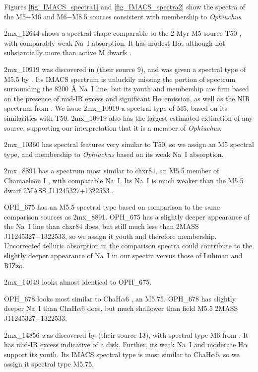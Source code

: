 Figures \ref{fig_IMACS_spectra1} and \ref{fig_IMACS_spectra2} show the spectra of the M5$-$M6 and M6$-$M8.5 sources consistent with membership to \emph{Ophiuchus}.

2mx\_12644 shows a spectral shape comparable to the 2 Myr M5 source T50 \citep{2004ApJ...602..816L}, with comparably weak Na~I absorption.  It has modest H$\alpha$, although not substantially more than active M dwarfs \citep{2011AJ....141...97W}.  

2mx\_10919 was discovered in \citet{allers06} (their source 9), and was given a spectral type of M5.5 by \citet{2011ASPC..448..633G}.  Its IMACS spectrum is unluckily missing the portion of spectrum surrounding the 8200 $\mbox{\normalfont\AA}$ Na~I line, but its youth and membership are firm based on the presence of mid-IR excess and significant H$\alpha$ emission, as well as the NIR spectrum from \citet{2011ASPC..448..633G}.  We issue 2mx\_10919 a spectral type of M5, based on its similarities with T50.  2mx\_10919 also has the largest estimated extinction of any source, supporting our interpretation that it is a member of \emph{Ophiuchus}.

2mx\_10360 has spectral features very similar to T50, so we assign an M5 spectral type, and membership to \emph{Ophiuchus} based on its weak Na~I absorption.

2mx\_8891 has a spectrum most similar to chxr84, an M5.5 member of Chamaeleon I \citep{2004ApJ...602..816L}, with comparable Na~I.  Its Na~I is much weaker than the M5.5 dwarf 2MASS J11245327+1322533 \citep{2003AJ....126.2421C}.

OPH\_675 has an M5.5 spectral type based on comparison to the same comparison sources as 2mx\_8891.  OPH\_675 has a slightly deeper appearance of the Na~I line than chxr84 does, but still much less than 2MASS J11245327+1322533, so we assign it youth and therefore membership.  Uncorrected telluric absorption in the comparison spectra could contribute to the slightly deeper appearance of Na~I in our spectra versus those of Luhman and RIZzo.  

2mx\_14049 looks almost identical to OPH\_675.

OPH\_678 looks most similar to ChaH$\alpha$6 \citep{2004ApJ...602..816L}, an M5.75.  OPH\_678 has slightly deeper Na~I than ChaH$\alpha$6 does, but much shallower than field M5.5 2MASS J11245327+1322533.  

2mx\_14856 was discovered by \citet{allers06} (their source 13), with spectral type M6 from \citet{2011ASPC..448..633G}.  It has mid-IR excess indicative of a disk.  Further, its weak Na~I and moderate H$\alpha$ support its youth.  Its IMACS spectral type is most similar to ChaH$\alpha$6, so we assign it spectral type M5.75.

